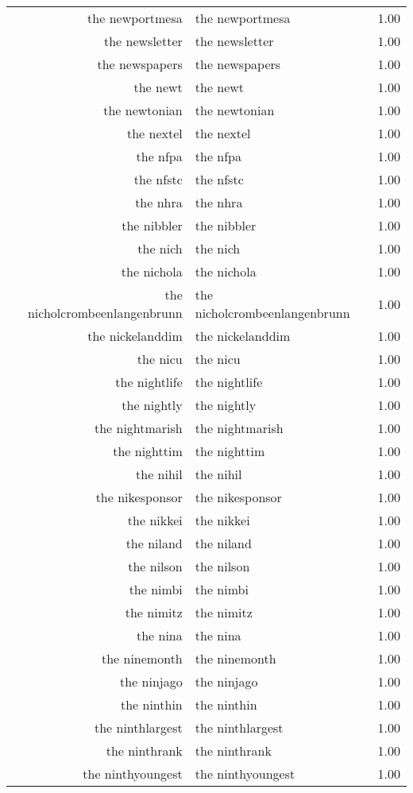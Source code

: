 \begin{table}[ht]
\begin{tabular}{rlr}
  the newportmesa & the newportmesa & 1.00 \\ 
  the newsletter & the newsletter & 1.00 \\ 
  the newspapers & the newspapers & 1.00 \\ 
  the newt & the newt & 1.00 \\ 
  the newtonian & the newtonian & 1.00 \\ 
  the nextel & the nextel & 1.00 \\ 
  the nfpa & the nfpa & 1.00 \\ 
  the nfstc & the nfstc & 1.00 \\ 
  the nhra & the nhra & 1.00 \\ 
  the nibbler & the nibbler & 1.00 \\ 
  the nich & the nich & 1.00 \\ 
  the nichola & the nichola & 1.00 \\ 
  the nicholcrombeenlangenbrunn & the nicholcrombeenlangenbrunn & 1.00 \\ 
  the nickelanddim & the nickelanddim & 1.00 \\ 
  the nicu & the nicu & 1.00 \\ 
  the nightlife & the nightlife & 1.00 \\ 
  the nightly & the nightly & 1.00 \\ 
  the nightmarish & the nightmarish & 1.00 \\ 
  the nighttim & the nighttim & 1.00 \\ 
  the nihil & the nihil & 1.00 \\ 
  the nikesponsor & the nikesponsor & 1.00 \\ 
  the nikkei & the nikkei & 1.00 \\ 
  the niland & the niland & 1.00 \\ 
  the nilson & the nilson & 1.00 \\ 
  the nimbi & the nimbi & 1.00 \\ 
  the nimitz & the nimitz & 1.00 \\ 
  the nina & the nina & 1.00 \\ 
  the ninemonth & the ninemonth & 1.00 \\ 
  the ninjago & the ninjago & 1.00 \\ 
  the ninthin & the ninthin & 1.00 \\ 
  the ninthlargest & the ninthlargest & 1.00 \\ 
  the ninthrank & the ninthrank & 1.00 \\ 
  the ninthyoungest & the ninthyoungest & 1.00 \\ 

\end{tabular}
\end{table}
